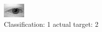 \begin{figure}[h!]
\begin{center}
\includegraphics[width=0.60\columnwidth]{figures/ID377_class_1_target_2.png}
\end{center}
\caption{ Classification: 1 actual target: 2}
\label{fig:ID377_class_1_target_2}
\end{figure}
